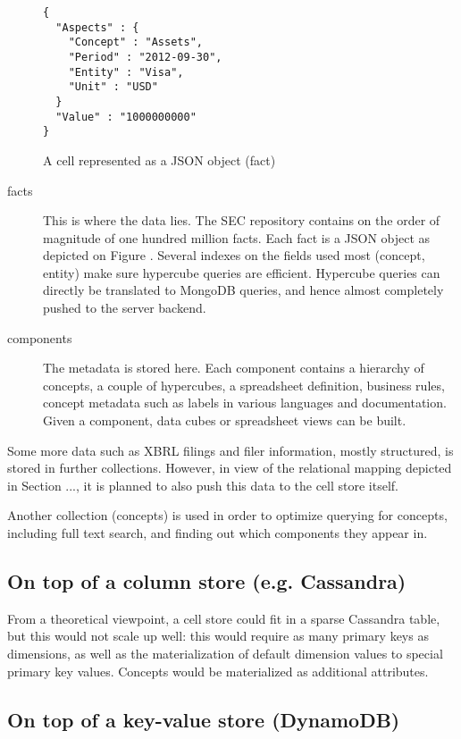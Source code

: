 \documentclass{vldb}
\begin{document}
\begin{figure}
\caption{A cell represented as a JSON object (fact)}
\label{fig-fact}
\begin{lstlisting}
{
  "Aspects" : {
    "Concept" : "Assets",
    "Period" : "2012-09-30",
    "Entity" : "Visa",
    "Unit" : "USD"
  }
  "Value" : "1000000000"
}
\end{lstlisting}
\end{figure}


\begin{description}
\item[facts] This is where the data lies. The SEC repository contains on the order of magnitude of one hundred million facts. Each fact is a JSON object as depicted on Figure \label{fig-fact}. Several indexes on the fields used most (concept, entity) make sure hypercube queries are efficient. Hypercube queries can directly be translated to MongoDB queries, and hence almost completely pushed to the server backend.
\item[components] The metadata is stored here. Each component contains a hierarchy of concepts, a couple of hypercubes, a spreadsheet definition, business rules, concept metadata such as labels in various languages and documentation. Given a component, data cubes or spreadsheet views can be built.
\end{description}

Some more data such as XBRL filings and filer information, mostly structured, is stored in further collections. However, in view of the relational mapping depicted in Section ..., it is planned to also push this data to the cell store itself.

Another collection (concepts) is used in order to optimize querying for concepts, including full text search, and finding out which components they appear in.

\subsection{On top of a column store (e.g. Cassandra)}

From a theoretical viewpoint, a cell store could fit in a sparse Cassandra table, but this would not scale up well: this would require as many primary keys as dimensions, as well as the materialization of default dimension values to special primary key values. Concepts would be materialized as additional attributes.

\subsection{On top of a key-value store (DynamoDB)}
\end{document}
